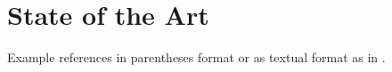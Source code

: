 \section{State of the Art}
\label{sec:State of the Art}

Example references in parentheses format \citep{Raibert1986LeggedRobotsThatBalance, Vukobratovic2004ZeroMomentPoint} or as textual format as in \citet{Pratt1995SEA}.